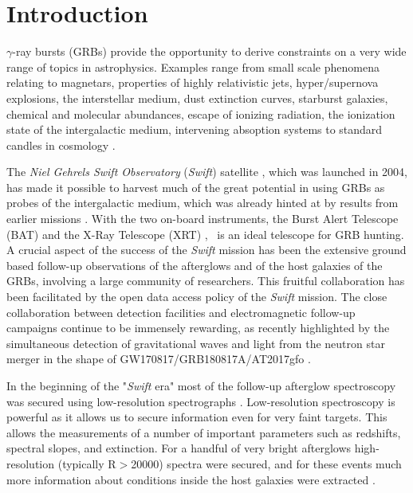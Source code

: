 \documentclass{aa}    %
\begin{document}
\section{Introduction}

$\gamma$-ray bursts (GRBs) provide the opportunity to derive constraints on
a very wide range of topics in astrophysics. Examples range from small scale
phenomena relating to magnetars, properties of highly relativistic jets,
hyper/supernova explosions, the interstellar medium, dust extinction curves,
starburst galaxies, chemical and molecular abundances, escape of ionizing
radiation, the ionization state of the intergalactic medium, intervening
absoption systems to standard candles in cosmology \citep[e.g.,][]{Lyons2010,
	Molinari2007, HjorthBloom2012, Wijers1998, Prochaska2009, Savaglio2006,
	Ghirlanda2007, Vergani2009, Christensen2017}.

The \textit{Niel Gehrels Swift Observatory} ({\it Swift}) satellite
\citep{Gehrels2004, Gehrels2009}, which was launched in 2004, has made it
possible to harvest much of the great potential in using GRBs as probes of the
intergalactic medium, which was already hinted at by results from earlier
missions \citep[e.g.,][]{Paradijs2000, Ricker2004}. With the two on-board
instruments, the Burst Alert Telescope (BAT) \citep{Barthelmy2005} and the X-Ray
Telescope (XRT) \citep{Burrows2005}, \swift~is an ideal telescope for GRB
hunting. A crucial aspect of the success of the {\it Swift} mission has been the
extensive ground based follow-up observations of the afterglows and of the host
galaxies of the GRBs, involving a large community of researchers. This fruitful
collaboration has been facilitated by the open data access policy of the
{\it Swift} mission. The close collaboration between detection facilities and
electromagnetic  follow-up campaigns continue to be immensely rewarding, as
recently highlighted by the simultaneous detection of gravitational waves and
light from the neutron star merger in the shape of GW170817/GRB180817A/AT2017gfo
\citep{LIGOScientificCollaboration2017a, LIGOScientificCollaboration2017}.

In the beginning of the "{\it Swift} era" most of the follow-up afterglow
spectroscopy was secured using low-resolution spectrographs \citep[typically
R=$\lambda/\Delta\lambda$$<$1000, e.g.][]{Fynbo2009}. Low-resolution
spectroscopy is powerful as it allows us to secure information even for very faint
targets. This allows the measurements of a number of important parameters such
as redshifts, spectral slopes, and extinction. For a handful of very bright
afterglows high-resolution (typically R$>$20000) spectra were secured, and for
these events much more information about conditions inside the host galaxies
were extracted \citep[e.g.,][]{Fiore2005, Thone2007, Prochaska2007,
	Vreeswijk2007, Castro-Tirado2010}.
\end{document}
